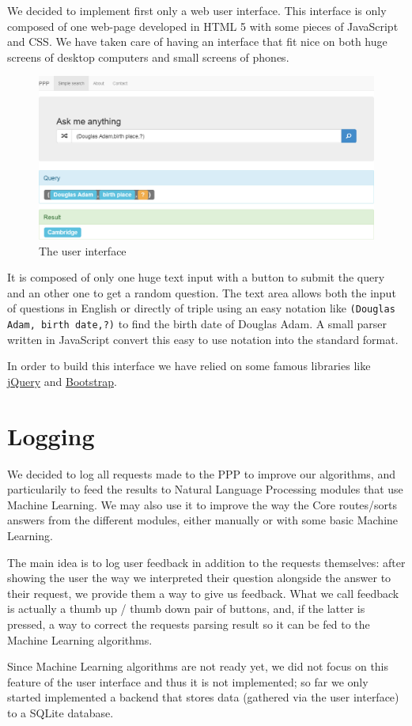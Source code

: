 We decided to implement first only a web user interface. This interface
is only composed of one web-page developed in HTML 5 with some
pieces of JavaScript and CSS. We have taken care of having an
interface that fit nice on both huge screens of desktop computers
and small screens of phones.

\begin{figure}[!ht]
    \centering
    \includegraphics[scale=0.35]{WebUI.png}
    \caption{The user interface}
\end{figure}

It is composed of only one huge text input with a button to submit
the query and an other one to get a random question. The text area
allows both the input of questions in English or directly of triple using
an easy notation like \texttt{(Douglas Adam, birth date,?)} to find the
birth date of Douglas Adam. A small parser written in JavaScript convert
this easy to use notation into the standard format.

In order to build this interface we have relied on some famous libraries 
like \href{http://jquery.com/}{jQuery} and \href{http://getbootstrap.com/}{Bootstrap}.

\section{Logging}

We decided to log all requests made to the PPP to improve our algorithms,
and particularily to feed the results to Natural Language Processing
modules that use Machine Learning.
We may also use it to improve the way the Core routes/sorts answers
from the different modules, either manually or with some basic
Machine Learning.

The main idea is to log user feedback in addition to the requests
themselves: after showing the user the way we interpreted their
question alongside the answer to their request, we provide them a
way to give us feedback.
What we call feedback is actually a thumb up / thumb down pair of
buttons, and, if the latter is pressed, a way to correct the requests
parsing result so it can be fed to the Machine Learning algorithms.

Since Machine Learning algorithms are not ready yet, we did not focus
on this feature of the user interface and thus it is not implemented;
so far we only started implemented a backend that stores data
(gathered via the user interface) to a SQLite database.
